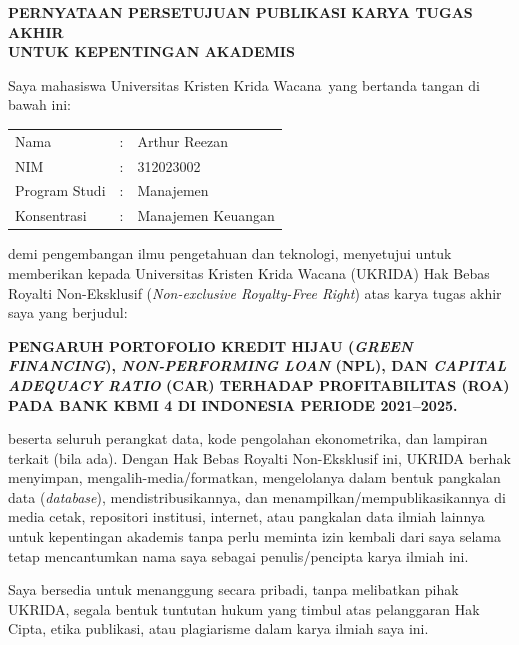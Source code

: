 \documentclass[12pt,a4paper]{article}
\newcommand{\ukrida}{Universitas Kristen Krida Wacana}
\newcommand{\prodi}{Manajemen}
\newcommand{\nahamahasiswa}{Arthur Reezan}
\newcommand{\nim}{312023002}
\numberwithin{equation}{section}
\begin{document}
\newpage
\thispagestyle{frontmatter}
\begin{center}
  {\large\bfseries PERNYATAAN PERSETUJUAN PUBLIKASI KARYA TUGAS AKHIR}\\[0.3cm]
  {\large\bfseries UNTUK KEPENTINGAN AKADEMIS}
\end{center}

\vspace{0.8cm}
\noindent Saya mahasiswa \ukrida\ yang bertanda tangan di bawah ini:

\vspace{0.5cm}
\noindent
\begin{tabular}{lll}
  Nama          & : & \nahamahasiswa \\
  NIM           & : & \nim \\
  Program Studi & : & \prodi \\
  Konsentrasi   & : & Manajemen Keuangan \\
\end{tabular}

\vspace{0.5cm}
\noindent
demi pengembangan ilmu pengetahuan dan teknologi, menyetujui untuk memberikan kepada Universitas Kristen Krida Wacana (UKRIDA) Hak Bebas Royalti Non-Eksklusif (\emph{Non-exclusive Royalty-Free Right}) atas karya tugas akhir saya yang berjudul:

\vspace{0.3cm}
\noindent
\textbf{PENGARUH PORTOFOLIO KREDIT HIJAU (\emph{GREEN FINANCING}), \emph{NON-PERFORMING LOAN} (NPL), DAN \emph{CAPITAL ADEQUACY RATIO} (CAR) TERHADAP PROFITABILITAS (ROA) PADA BANK KBMI 4 DI INDONESIA PERIODE 2021--2025.}

\vspace{0.5cm}
\noindent
beserta seluruh perangkat data, kode pengolahan ekonometrika, dan lampiran terkait (bila ada). Dengan Hak Bebas Royalti Non-Eksklusif ini, UKRIDA berhak menyimpan, mengalih-media/formatkan, mengelolanya dalam bentuk pangkalan data (\emph{database}), mendistribusikannya, dan menampilkan/mempublikasikannya di media cetak, repositori institusi, internet, atau pangkalan data ilmiah lainnya untuk kepentingan akademis tanpa perlu meminta izin kembali dari saya selama tetap mencantumkan nama saya sebagai penulis/pencipta karya ilmiah ini.

\vspace{0.3cm}
\noindent
Saya bersedia untuk menanggung secara pribadi, tanpa melibatkan pihak UKRIDA, segala bentuk tuntutan hukum yang timbul atas pelanggaran Hak Cipta, etika publikasi, atau plagiarisme dalam karya ilmiah saya ini.
\end{document}
